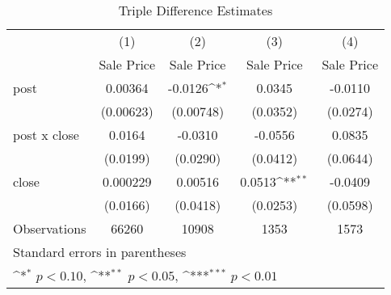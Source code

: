 \begin{table}[htbp]\centering
\def\sym#1{\ifmmode^{#1}\else\(^{#1}\)\fi}
\caption{Triple Difference Estimates\label{tabl}}
\begin{tabular}{l*{4}{c}}
\hline\hline
                    &\multicolumn{1}{c}{(1)}&\multicolumn{1}{c}{(2)}&\multicolumn{1}{c}{(3)}&\multicolumn{1}{c}{(4)}\\
                    &\multicolumn{1}{c}{Sale Price}&\multicolumn{1}{c}{Sale Price}&\multicolumn{1}{c}{Sale Price}&\multicolumn{1}{c}{Sale Price}\\
\hline
post                &     0.00364         &     -0.0126\sym{*}  &      0.0345         &     -0.0110         \\
                    &   (0.00623)         &   (0.00748)         &    (0.0352)         &    (0.0274)         \\
[1em]
post x close        &      0.0164         &     -0.0310         &     -0.0556         &      0.0835         \\
                    &    (0.0199)         &    (0.0290)         &    (0.0412)         &    (0.0644)         \\
[1em]
close               &    0.000229         &     0.00516         &      0.0513\sym{**} &     -0.0409         \\
                    &    (0.0166)         &    (0.0418)         &    (0.0253)         &    (0.0598)         \\
\hline
Observations        &       66260         &       10908         &        1353         &        1573         \\
\hline\hline
\multicolumn{5}{l}{\footnotesize Standard errors in parentheses}\\
\multicolumn{5}{l}{\footnotesize \sym{*} \(p<0.10\), \sym{**} \(p<0.05\), \sym{***} \(p<0.01\)}\\
\end{tabular}
\end{table}
